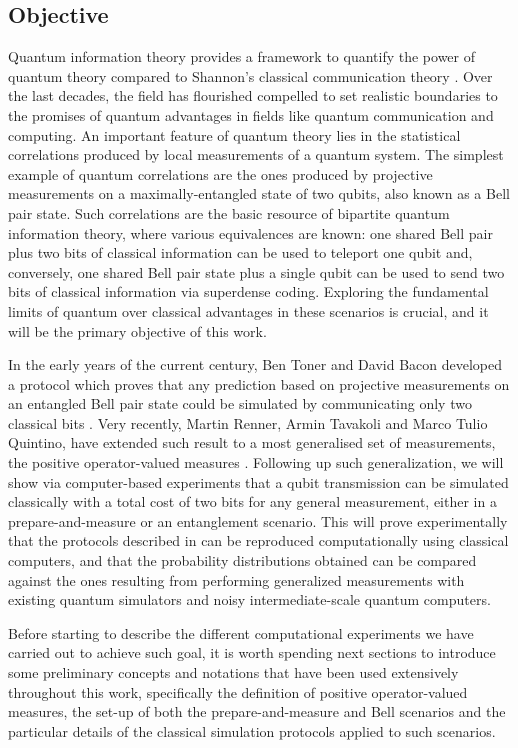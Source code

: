 \subsection{Objective}
Quantum information theory provides a framework to quantify the power of quantum theory compared to Shannon's classical communication theory \cite{shannon}. Over the last decades, the field has flourished compelled to set realistic boundaries to the promises of quantum advantages in fields like quantum communication and computing. An important feature of quantum theory lies in the statistical correlations produced by local measurements of a quantum system. The simplest example of quantum correlations are the ones produced by projective measurements on a maximally-entangled state of two qubits, also known as a Bell pair state. Such correlations are the basic resource of bipartite quantum information theory, where various equivalences are known: one shared Bell pair plus two bits of classical information can be used to teleport one  qubit and, conversely, one shared Bell pair state plus a single qubit can be used to send two bits of classical information via superdense coding. Exploring the fundamental limits of quantum over classical advantages in these scenarios is crucial, and it will be the primary objective of this work.
\par
In the early years of the current century, Ben Toner and David Bacon developed a protocol which proves that any prediction based on projective measurements on an entangled Bell pair state could be simulated by communicating only two classical bits \cite{toner2003}. Very recently, Martin Renner, Armin Tavakoli and Marco Tulio Quintino, have extended such result to a most generalised set of measurements, the positive operator-valued measures \cite{renner2023}.
Following up such generalization, we will show via computer-based experiments that a qubit transmission can be simulated classically with a total cost of two bits for any general measurement, either in a prepare-and-measure or an entanglement scenario. This will prove experimentally that the protocols described in \cite{renner2023} can be reproduced computationally using classical computers, and that the probability distributions obtained can be compared against the ones resulting from performing generalized measurements with existing quantum simulators and noisy intermediate-scale quantum computers.
\par
Before starting to describe the different computational experiments we have carried out to achieve such goal, it is worth spending next sections to introduce some preliminary concepts and notations that have been used extensively throughout this work, specifically the definition of positive operator-valued measures, the set-up of both the prepare-and-measure and Bell scenarios and the particular details of the classical simulation protocols applied to such scenarios.
\par
